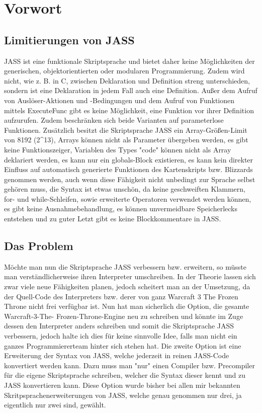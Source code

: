 \chapter{Vorwort}

\section{Limitierungen von JASS}
JASS ist eine funktionale Skriptsprache und bietet daher keine Möglichkeiten der generischen, objektorientierten
oder modularen Programmierung. Zudem wird nicht, wie z. B. in C, zwischen Deklaration und Definition streng unterschieden,
sondern ist eine Deklaration in jedem Fall auch eine Definition.
Außer dem Aufruf von Auslöser-Aktionen und -Bedingungen und dem Aufruf von Funktionen mittels ExecuteFunc gibt es keine
Möglichkeit, eine Funktion vor ihrer Definition aufzurufen. Zudem beschränken sich beide Varianten auf parameterlose
Funktionen.
Zusätzlich besitzt die Skriptsprache JASS ein Array-Größen-Limit von 8192 (2^13), Arrays können nicht als Parameter
übergeben werden, es gibt keine Funktionszeiger, Variablen des Types "code" können nicht als Array deklariert werden,
es kann nur ein globals-Block existieren, es kann kein direkter Einfluss auf automatisch generierte Funktionen
des Kartenskripts bzw. Blizzards genommen werden, auch wenn diese Fähigkeit nicht unbedingt zur Sprache selbst gehören muss,
die Syntax ist etwas unschön, da keine geschweiften Klammern, for- und while-Schleifen, sowie erweiterte Operatoren verwendet
werden können, es gibt keine Ausnahmebehandlung, es können unvermeidbare Speicherlecks entstehen und zu guter Letzt
gibt es keine Blockkommentare in JASS.

\section{Das Problem}
Möchte man nun die Skriptsprache JASS verbessern bzw. erweitern, so müsste man verständlicherweise ihren Interpreter umschreiben.
In der Theorie lassen sich zwar viele neue Fähigkeiten planen, jedoch scheitert man an der Umsetzung, da der Quell-Code des Interpreters
bzw. derer von ganz Warcraft 3 The Frozen Throne nicht frei verfügbar ist. Nun hat man sicherlich die Option, die gesamte Warcraft-3-The-
Frozen-Throne-Engine neu zu schreiben und könnte im Zuge dessen den Interpreter anders schreiben und somit die Skriptsprache JASS verbessern,
jedoch halte ich dies für keine sinnvolle Idee, falls man nicht ein ganzes Programmiererteam hinter sich stehen hat.
Die zweite Option ist eine Erweiterung der Syntax von JASS, welche jederzeit in reinen JASS-Code konvertiert werden kann.
Dazu muss man "nur" einen Compiler bzw. Precompiler für die eigene Skriptsprache schreiben, welcher die Syntax dieser kennt und zu JASS konvertieren
kann.
Diese Option wurde bisher bei allen mir bekannten Skritpsprachenerweiterungen von JASS, welche genau genommen nur drei, ja eigentlich nur zwei sind, gewählt.

